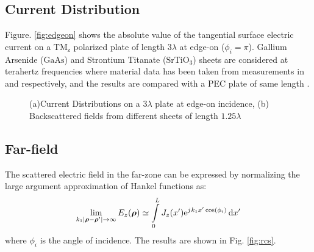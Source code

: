 \subsection{Current Distribution}
%
Figure. \ref{fig:edgeon} shows the absolute value of the tangential surface electric current on a $\mathrm{TM_z}$ polarized plate of length $3 \lambda$ at edge-on ($\phi_i = \pi$). Gallium Arsenide ($\mathrm{GaAs}$) and Strontium Titanate ($\mathrm{SrTiO_3}$) sheets are considered at terahertz frequencies where material data has been taken from measurements in \cite{Burke2000} and \cite{herranz2012high} respectively, and the results are compared with a PEC plate of same length \cite{senior1979backscattering}.
%
\begin{figure}[!htbp]
  \centering
  \caption{(a)Current Distributions on a $3\lambda$ plate at edge-on incidence, (b) Backscattered fields from different sheets of length $1.25\lambda$}
  \label{fig:Electric_properties_2DEG_thin}
\end{figure}
%
\subsection{Far-field}
%
The scattered electric field in the far-zone can be expressed by normalizing the large argument approximation of Hankel functions as:
%
\begin{equation}
  \lim_{k_1|\boldsymbol {\rho} - \boldsymbol {\rho}'|\to\infty} E_z(\boldsymbol {\rho}) \simeq \int \limits_{0}^{L} J_z(x') \mathrm{e}^{{j}\mkern1mu k_1 x' \cos(\phi_i)} \mathop{}\!\mathrm{d}{x'}
  \label{eq:far-field}
\end{equation}
%
where $\phi_i$ is the angle of incidence. The results are shown in Fig. \ref{fig:rcs}.
%
